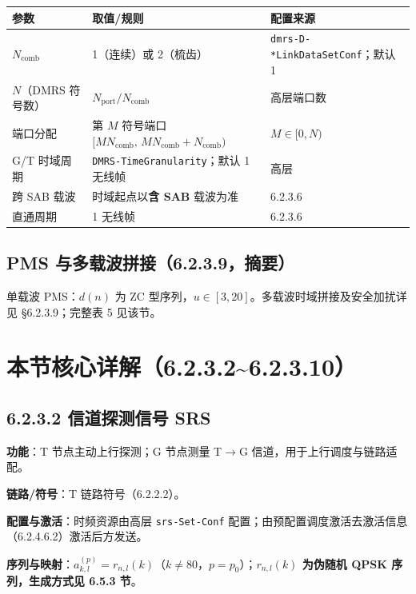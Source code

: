 \documentclass[11pt,a4paper]{ctexart}
\begin{document}
\begin{table}[h]
\centering
\small
\begin{tabular}{lll}
\toprule
\textbf{参数} & \textbf{取值/规则} & \textbf{配置来源} \\
\midrule
$N_{\mathrm{comb}}$ & 1（连续）或 2（梳齿） & \texttt{dmrs-D-*LinkDataSetConf}；默认 1 \\
$N$（DMRS 符号数） & $N_{\mathrm{port}}/N_{\mathrm{comb}}$ & 高层端口数 \\
端口分配 & 第 $M$ 符号端口 $[M N_{\mathrm{comb}},\, M N_{\mathrm{comb}}+N_{\mathrm{comb}})$ & $M{\in}[0,N)$ \\
G/T 时域周期 & \texttt{DMRS-TimeGranularity}；默认 1 无线帧 & 高层 \\
跨 SAB 载波 & 时域起点以\textbf{含 SAB} 载波为准 & 6.2.3.6 \\
直通周期 & 1 无线帧 & 6.2.3.6 \\
\bottomrule
\end{tabular}
\end{table}

\subsection{PMS 与多载波拼接（6.2.3.9，摘要）}

单载波 PMS：$d(n)$ 为 ZC 型序列，$u{\in}[3,20]$。多载波时域拼接及安全加扰详见 \S6.2.3.9；完整表 5 见该节。

\section{本节核心详解（6.2.3.2\textasciitilde 6.2.3.10）}

\subsection{6.2.3.2 信道探测信号 SRS}

\textbf{功能}：T 节点主动上行探测；G 节点测量 T$\rightarrow$G 信道，用于上行调度与链路适配。

\textbf{链路/符号}：T 链路符号（6.2.2.2）。

\textbf{配置与激活}：时频资源由高层 \texttt{srs-Set-Conf} 配置；由预配置调度激活去激活信息（6.2.4.6.2）激活后方发送。

\textbf{序列与映射}：$a_{k,l}^{(p)}=r_{n,l}(k)$（$k{\neq}80$，$p{=}p_0$）；\textbf{$r_{n,l}(k)$ 为伪随机 QPSK 序列，生成方式见 6.5.3 节}。
\end{document}
